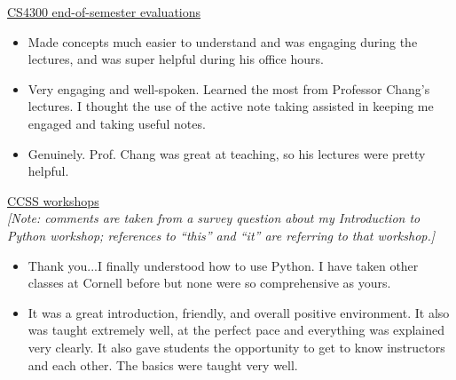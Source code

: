 \documentclass[12pt,letterpaper]{article}
\begin{document}
\noindent\underline{CS4300 end-of-semester evaluations}
\begin{itemize}
    \item Made concepts much easier to understand and was engaging during the lectures, and was super helpful during his office hours.
    \item Very engaging and well-spoken. Learned the most from Professor Chang's lectures. I thought the use of the active note taking assisted in keeping me engaged and taking useful notes.
    \item Genuinely. Prof. Chang was great at teaching, so his lectures were pretty helpful.
\end{itemize}

\noindent\underline{CCSS workshops}\\
\emph{[Note: comments are taken from a survey question about my Introduction to Python workshop; references to ``this'' and ``it'' are referring to that workshop.]}
\begin{itemize}
    \item Thank you...I finally understood how to use Python. I have taken other classes at Cornell before but none were so comprehensive as yours.
    \item It was a great introduction, friendly, and overall positive environment. It also was taught extremely well, at the perfect pace and everything was explained very clearly. It also gave students the opportunity to get to know instructors and each other. The basics were taught very well.
\end{itemize}

\else
%
\fi
\end{document}
